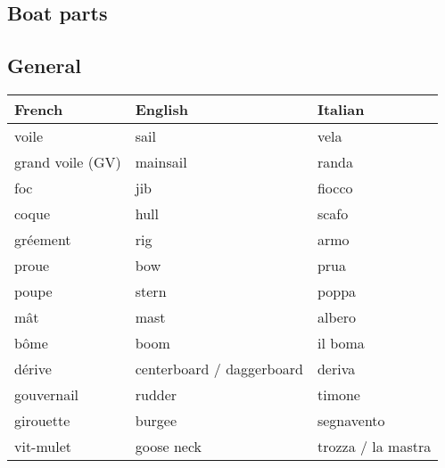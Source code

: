 \documentclass[a4paper, 12pt, twoside]{article}
\begin{document}
    \begin{indt}{\section{Boat parts}} %
        \begin{indt}{\subsection{General}} %
            \begin{tabular}{|l|l|l|}
                \hline %
                \textbf{French}
                & \textbf{English}
                & \textbf{Italian}
                \\
                \hline
                \hline %
                voile %
                & sail
                & vela
                \\
                \hline %
                grand voile (GV) %
                & mainsail
                & randa
                \\
                \hline %
                foc %
                & jib
                & fiocco
                \\
                \hline %
                coque %
                & hull
                & scafo
                \\
                \hline %
                gréement %
                & rig
                & armo
                \\
                \hline %
                proue %
                & bow
                & prua
                \\
                \hline %
                poupe %
                & stern
                & poppa
                \\
                \hline %
                mât %
                & mast
                & albero
                \\
                \hline %
                bôme %
                & boom
                & il boma
                \\
                \hline %
                dérive %
                & centerboard / daggerboard 
                & deriva
                \\
                \hline %
                gouvernail  %
                & rudder
                & timone
                \\
                \hline %
                girouette %
                & burgee
                & segnavento
                \\
                \hline %
                vit-mulet %
                & goose neck
                & trozza / la mastra
                \\
                \hline %
            \end{tabular}
        \end{indt} %


\end{indt}
\end{document}
